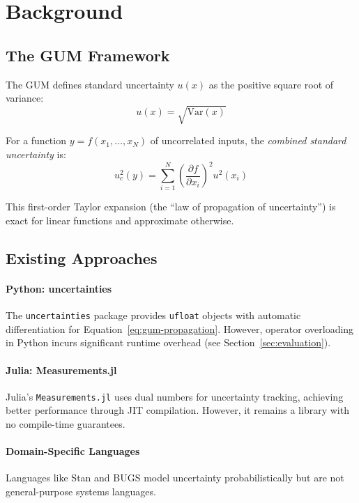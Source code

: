 \documentclass[11pt,a4paper]{article}
\begin{document}
\section{Background}
\label{sec:background}

\subsection{The GUM Framework}

The GUM \citep{jcgm2008gum} defines standard uncertainty $u(x)$ as the
positive square root of variance:
\[
u(x) = \sqrt{\text{Var}(x)}
\]

For a function $y = f(x_1, \ldots, x_N)$ of uncorrelated inputs, the
\emph{combined standard uncertainty} is:
\begin{equation}
  u_c^2(y) = \sum_{i=1}^{N} \left(\frac{\partial f}{\partial x_i}\right)^2 u^2(x_i)
  \label{eq:gum-propagation}
\end{equation}

This first-order Taylor expansion (the ``law of propagation of uncertainty'')
is exact for linear functions and approximate otherwise.

\subsection{Existing Approaches}

\paragraph{Python: uncertainties}
The \texttt{uncertainties} package \citep{lebigot2024uncertainties} provides
\texttt{ufloat} objects with automatic differentiation for Equation~\ref{eq:gum-propagation}.
However, operator overloading in Python incurs significant runtime overhead
(see Section~\ref{sec:evaluation}).

\paragraph{Julia: Measurements.jl}
Julia's \texttt{Measurements.jl} \citep{giordano2016measurements} uses dual
numbers for uncertainty tracking, achieving better performance through JIT
compilation. However, it remains a library with no compile-time guarantees.

\paragraph{Domain-Specific Languages}
Languages like Stan \citep{carpenter2017stan} and BUGS model uncertainty
probabilistically but are not general-purpose systems languages.
\end{document}
